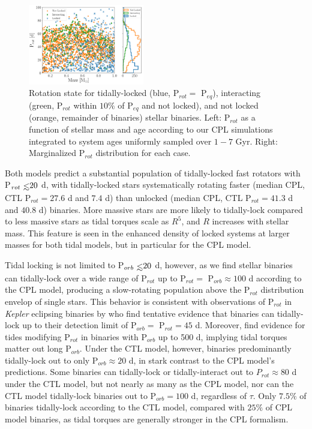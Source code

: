 \documentclass[twocolumn]{aastex61}
\def\lsim{~\rlap{$<$}{\lower 1.0ex\hbox{$\sim$}}}
\newcommand{\kepler}[0]{\textit{Kepler}\xspace}
\begin{document}
\begin{figure}
	\includegraphics[width=0.45\textwidth]{../Plots/lockedCPL.pdf}
   \caption{Rotation state for tidally-locked (blue, P$_{rot} = $ P$_{eq}$), interacting (green, P$_{rot}$ within $10\%$ of P$_{eq}$ and not locked), and not locked (orange, remainder of binaries) stellar binaries. Left: P$_{rot}$ as a function of stellar mass and age according to our CPL simulations integrated to system ages uniformly sampled over $1-7$ Gyr. Right: Marginalized P$_{rot}$ distribution for each case.}%
    \label{fig:lockedCPL}%
\end{figure}

Both models predict a substantial population of tidally-locked fast rotators with P$_{rot} \lsim 20$ d, with tidally-locked stars systematically rotating faster (median CPL, CTL P$_{rot} = 27.6$ d and $7.4$ d) than unlocked (median CPL, CTL P$_{rot} = 41.3$ d and $40.8$ d) binaries. More massive stars are more likely to tidally-lock compared to less massive stars as tidal torques scale as $R^5$, and $R$ increases with stellar mass.  This feature is seen in the enhanced density of locked systems at larger masses for both tidal models, but in particular for the CPL model.

Tidal locking is not limited to P$_{orb} \lsim 20$ d, however, as we find stellar binaries can tidally-lock over a wide range of P$_{rot}$ up to P$_{rot} =$ P$_{orb} \approx 100$ d according to the CPL model, producing a slow-rotating population above the P$_{rot}$ distribution envelop of single stars. This behavior is consistent with observations of P$_{rot}$ in \kepler eclipsing binaries by \citet{Lurie2017} who find tentative evidence that binaries can tidally-lock up to their detection limit of P$_{orb} = $ P$_{rot} = 45$ d.  Moreover, \citet{Abt2004} find evidence for tides modifying P$_{rot}$ in binaries with P$_{orb}$ up to 500 d, implying tidal torques matter out long P$_{orb}$. Under the CTL model, however, binaries predominantly tidally-lock out to only P$_{orb} \approx 20$ d, in stark contrast to the CPL model's predictions. Some binaries can tidally-lock or tidally-interact out to $P_{rot} \approx 80$ d under the CTL model, but not nearly as many as the CPL model, nor can the CTL model tidally-lock binaries out to P$_{orb} = 100$ d, regardless of $\tau$. Only $7.5\%$ of binaries tidally-lock according to the CTL model, compared with $25\%$ of CPL model binaries, as tidal torques are generally stronger in the CPL formalism.   
\end{document}
